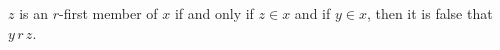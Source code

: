 $z$ is an $r$-first member of $x$ if and only if $z \in x$ and if $y \in x$, then it is false that $y \, r \, z$.
